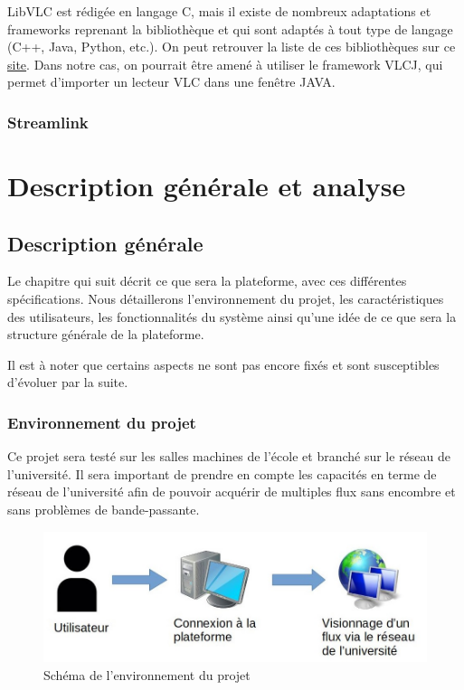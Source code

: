 \documentclass{polytech/polytech}
\begin{document}
LibVLC est rédigée en langage C, mais il existe de nombreux adaptations et frameworks reprenant la bibliothèque et qui sont adaptés à tout type de langage (C++, Java, Python, etc.). On peut retrouver la liste de ces bibliothèques sur ce \href{https://wiki.videolan.org/LibVLC/}{site}. Dans notre cas, on pourrait être amené à utiliser le framework VLCJ, qui permet d’importer un lecteur VLC dans une fenêtre JAVA.


\section{Streamlink}


\part{Description générale et analyse}


\chapter{Description générale}

Le chapitre qui suit décrit ce que sera la plateforme, avec ces différentes spécifications. Nous détaillerons l’environnement du projet, les caractéristiques des utilisateurs, les fonctionnalités du système ainsi qu’une idée de ce que sera la structure générale de la plateforme.

Il est à noter que certains aspects ne sont pas encore fixés et sont susceptibles d’évoluer par la suite.

\section{Environnement du projet}

Ce projet sera testé sur les salles machines de l’école et branché sur le réseau de l’université. Il sera important de prendre en compte les capacités en terme de réseau de l’université afin de pouvoir acquérir de multiples flux sans encombre et sans problèmes de bande-passante.

\begin{figure}
	\includegraphics[scale=0.75]{images/environnement}
	\caption{Schéma de l'environnement du projet}
	\label{fig:environnement}
\end{figure}
\end{document}
